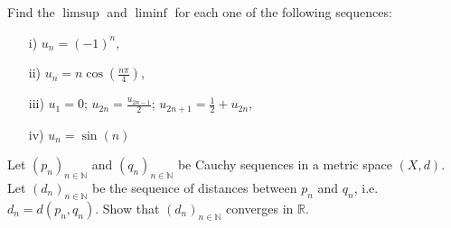 \documentclass[11pt]{article}%
\begin{document}
\begin{Exercise}[title=**$\dagger$]
	[Rudin 3.4]
Find the $\limsup$ and $\liminf$ for each one of the following sequences:
\begin{enumerate}
	\item[i)] $u_n=(-1)^n$,
	\item[ii)] $u_n=n\cos(\frac{n\pi}{4})$,
	\item[iii)] $u_1=0$; $u_{2n}=\frac{u_{2n-1}}{2}$; $u_{2n+1}=\frac{1}{2} + u_{2n}$,
	\item[iv)] $u_n=\sin(n)$
\end{enumerate}
\end{Exercise}

\begin{Exercise}[title= **$\dagger$]
Let $(p_n)_{n\in\mathbb{N}}$ and $(q_n)_{n\in\mathbb{N}}$ be Cauchy sequences in a metric space $(X,d)$. Let $(d_n)_{n\in\mathbb{N}}$ be the sequence of distances between $p_n$ and $q_n$, i.e.  $d_n=d(p_n,q_n)$. Show that $(d_n)_{n\in\mathbb{N}}$ converges in $\mathbb R$.
\end{Exercise}
\end{document}

